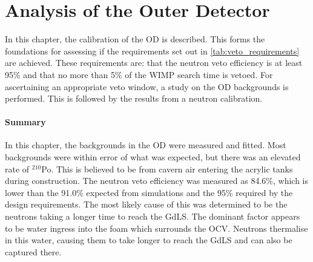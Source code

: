 \chapter{Analysis of the Outer Detector} \label{chap:analysis_of_the_od}

\par
In this chapter, the calibration of the OD is described.
This forms the foundations for assessing if the requirements set out in \autoref{tab:veto_requirements} are achieved.
These requirements are: that the neutron veto efficiency is at least 95\% and that no more than 5\% of the WIMP search time is vetoed.
For ascertaining an appropriate veto window, a study on the OD backgrounds is performed. 
This is followed by the results from a neutron calibration.



\clearpage

\clearpage


%

\subsubsection*{Summary}
\par
In this chapter, the backgrounds in the OD were measured and fitted.
Most backgrounds were within error of what was expected, but there was an elevated rate of ${}^{210}$Po.
This is believed to be from cavern air entering the acrylic tanks during construction.
The neutron veto efficiency was measured as 84.6\%, which is lower than the 91.0\% expected from simulations and the 95\% required by the design requirements.
The most likely cause of this was determined to be the neutrons taking a longer time to reach the GdLS.
The dominant factor appears to be water ingress into the foam which surrounds the OCV.
Neutrons thermalise in this water, causing them to take longer to reach the GdLS and can also be captured there.